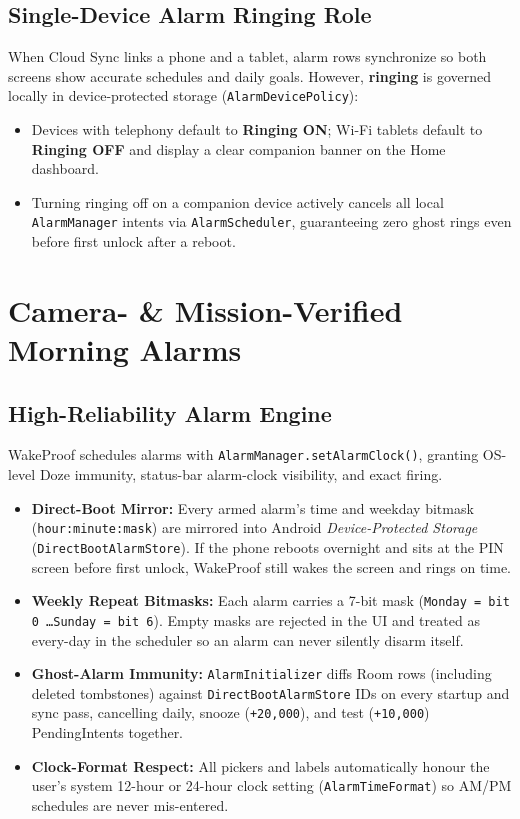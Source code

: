 \documentclass[11pt,a4paper]{article}
\begin{document}
\subsection{Single-Device Alarm Ringing Role}
When Cloud Sync links a phone and a tablet, alarm rows synchronize so both screens show accurate schedules and daily goals. However, \textbf{ringing} is governed locally in device-protected storage (\texttt{AlarmDevicePolicy}):
\begin{itemize}
  \item Devices with telephony default to \textbf{Ringing ON}; Wi-Fi tablets default to \textbf{Ringing OFF} and display a clear companion banner on the Home dashboard.
  \item Turning ringing off on a companion device actively cancels all local \texttt{AlarmManager} intents via \texttt{AlarmScheduler}, guaranteeing zero ghost rings even before first unlock after a reboot.
\end{itemize}

\section{Camera- \& Mission-Verified Morning Alarms}

\subsection{High-Reliability Alarm Engine}
WakeProof schedules alarms with \texttt{AlarmManager.setAlarmClock()}, granting OS-level Doze immunity, status-bar alarm-clock visibility, and exact firing.
\begin{itemize}
  \item \textbf{Direct-Boot Mirror:} Every armed alarm's time and weekday bitmask (\texttt{hour:minute:mask}) are mirrored into Android \emph{Device-Protected Storage} (\texttt{DirectBootAlarmStore}). If the phone reboots overnight and sits at the PIN screen before first unlock, WakeProof still wakes the screen and rings on time.
  \item \textbf{Weekly Repeat Bitmasks:} Each alarm carries a 7-bit mask (\texttt{Monday = bit 0 \dots Sunday = bit 6}). Empty masks are rejected in the UI and treated as every-day in the scheduler so an alarm can never silently disarm itself.
  \item \textbf{Ghost-Alarm Immunity:} \texttt{AlarmInitializer} diffs Room rows (including deleted tombstones) against \texttt{DirectBootAlarmStore} IDs on every startup and sync pass, cancelling daily, snooze (\texttt{+20,000}), and test (\texttt{+10,000}) PendingIntents together.
  \item \textbf{Clock-Format Respect:} All pickers and labels automatically honour the user's system 12-hour or 24-hour clock setting (\texttt{AlarmTimeFormat}) so AM/PM schedules are never mis-entered.
\end{itemize}
\end{document}
